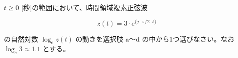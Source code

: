 $t \ge 0$ [秒]の範囲において、時間領域複素正弦波 

\[
z(t) =  3 \cdot \textrm{e}^{\{ j \cdot \pi/2 \cdot t \}}
\]

\bigskip
\noindent の自然対数 $\log_e z(t)$ の動きを選択肢 a〜d の中から1つ選びなさい。なお $\log_e 3 \approx 1.1$ とする。
